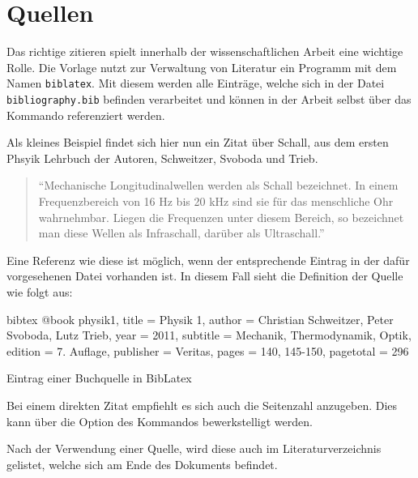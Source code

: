 \section{Quellen} 
Das richtige zitieren spielt innerhalb der wissenschaftlichen Arbeit eine wichtige Rolle. Die Vorlage nutzt zur Verwaltung von Literatur ein Programm mit dem Namen \verb|biblatex|. Mit diesem werden alle Einträge, welche sich in der Datei \verb|bibliography.bib| befinden verarbeitet und können in der Arbeit selbst über das Kommando  referenziert werden.

Als kleines Beispiel findet sich hier nun ein Zitat über Schall, aus dem ersten Phsyik Lehrbuch der Autoren, Schweitzer, Svoboda und Trieb.

\begin{quote}
\enquote{Mechanische Longitudinalwellen werden als Schall bezeichnet. In einem Frequenzbereich von 16 Hz bis 20 kHz sind sie für das menschliche Ohr wahrnehmbar. Liegen die Frequenzen unter diesem Bereich, so bezeichnet man diese Wellen als Infraschall, darüber als Ultraschall.} \cite[S. 145]{physik1}
\end{quote}

Eine Referenz wie diese ist möglich, wenn der entsprechende Eintrag in der dafür vorgesehenen Datei vorhanden ist. In diesem Fall sieht die Definition der Quelle wie folgt aus:

\begin{listing}
\begin{code}{bibtex}
@book{ physik1,
	title = {Physik 1},
	author = {Christian Schweitzer, Peter Svoboda, Lutz Trieb},
	year = {2011},
	subtitle = {Mechanik, Thermodynamik, Optik},
	edition = {7. Auflage},
	publisher = {Veritas},
	pages = {140, 145-150},
	pagetotal = {296}
}
\end{code}
\caption{Eintrag einer Buchquelle in BibLatex}
\end{listing}

Bei einem direkten Zitat empfiehlt es sich auch die Seitenzahl anzugeben. Dies kann über die Option des Kommandos  bewerkstelligt werden.

Nach der Verwendung einer Quelle, wird diese auch im Literaturverzeichnis gelistet, welche sich am Ende des Dokuments befindet.
